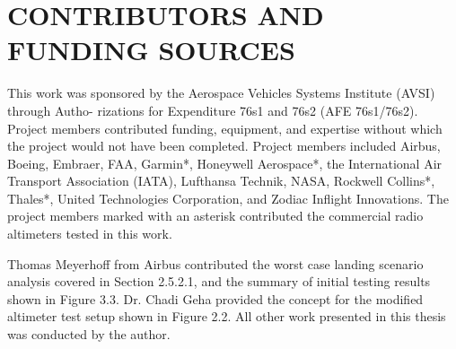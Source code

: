 %
%
%
%


\chapter*{CONTRIBUTORS AND FUNDING SOURCES}

This work was sponsored by the Aerospace Vehicles Systems Institute (AVSI) through Autho- rizations for Expenditure 76s1 and 76s2 (AFE 76s1/76s2). Project members contributed funding, equipment, and expertise without which the project would not have been completed.  Project members included Airbus, Boeing, Embraer, FAA, Garmin*, Honeywell Aerospace*, the  International Air Transport Association (IATA), Lufthansa Technik, NASA, Rockwell Collins*, Thales*, United Technologies Corporation, and Zodiac Inflight Innovations. The project members marked with an asterisk contributed the commercial radio altimeters tested in this work.

Thomas Meyerhoff from Airbus contributed the worst case landing scenario analysis covered in Section 2.5.2.1, and the summary of initial testing results shown in Figure 3.3. Dr. Chadi Geha provided the concept for the modified altimeter test setup shown in Figure 2.2.  All other work presented in this thesis was conducted by the author.

\pagebreak{}
